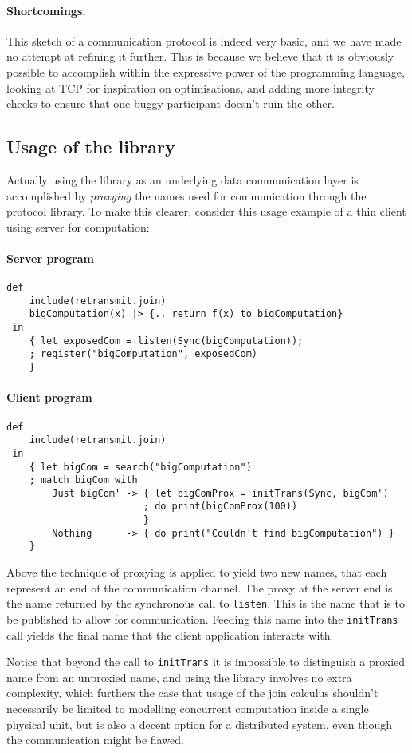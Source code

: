 \paragraph{Shortcomings.} This sketch of a communication protocol is indeed very
basic, and we have made no attempt at refining it further.  This is because we
believe that it is obviously possible to accomplish within the expressive power
of the programming language, looking at TCP for inspiration on optimisations,
and adding more integrity checks to ensure that one buggy participant doesn't
ruin the other.

\subsection{Usage of the library}

Actually using the library as an underlying data communication layer is
accomplished by \emph{proxying} the names used for communication through the
protocol library.  To make this clearer, consider this usage example of a thin
client using server for computation:

\paragraph{Server program}

\begin{verbatim}
def
    include(retransmit.join)
    bigComputation(x) |> {.. return f(x) to bigComputation}
 in
    { let exposedCom = listen(Sync(bigComputation));
    ; register("bigComputation", exposedCom)
    }
\end{verbatim}

\paragraph{Client program}

\begin{verbatim}
def
    include(retransmit.join)
 in
    { let bigCom = search("bigComputation")
    ; match bigCom with
        Just bigCom' -> { let bigComProx = initTrans(Sync, bigCom')
                        ; do print(bigComProx(100))
                        }
        Nothing      -> { do print("Couldn't find bigComputation") }
    }
\end{verbatim}

Above the technique of proxying is applied to yield two new names,
that each represent an end of the communication channel.
The proxy at the server end is the name returned by the synchronous call to
\texttt{listen}. This is the name that is to be published to allow for
communication. Feeding this name into the \texttt{initTrans} call yields the
final name that the client application interacts with.

Notice that beyond the call to \texttt{initTrans} it is impossible to
distinguish a proxied name from an unproxied name, and using the library
involves no extra complexity, which furthers the case that usage of the join
calculus shouldn't necessarily be limited to modelling concurrent computation
inside a single physical unit, but is also a decent option for a distributed
system, even though the communication might be flawed.

